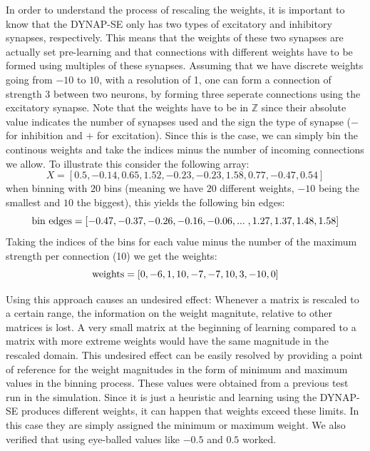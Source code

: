\documentclass[twoside,11pt]{article}
\begin{document}
In order to understand the process of rescaling the weights, it is important to know that
the DYNAP-SE only has two types of excitatory and inhibitory synapses, respectively.
This means that the weights of these two synapses are actually set pre-learning
and that connections with different weights have to be formed using multiples of these
synapses.
Assuming that we have discrete weights going from $-10$ to $10$, with a resolution of 1, one
can form a connection of strength 3 between two neurons, by forming three seperate connections
using the excitatory synapse. Note that the weights have to be in $\mathbb{Z}$ since
their absolute value indicates the number of synapses used and the sign the type of
synapse ($-$ for inhibition and $+$ for excitation).
Since this is the case, we can simply bin the continous weights and take the indices minus
the number of incoming connections we allow.
To illustrate this consider the following array:
\begin{equation*}
X = [ 0.5 , -0.14,  0.65,  1.52, -0.23, -0.23,  1.58,  0.77, -0.47, 0.54]
\end{equation*}
when binning with $20$ bins (meaning we have $20$ different weights, $-10$ being the smallest and $10$ the biggest),
this yields the following bin edges:
\begin{equation*}
\textnormal{bin edges} = [-0.47, -0.37, -0.26, -0.16, -0.06,  ... \; ,  1.27, 1.37,  1.48,  1.58]
\end{equation*}
Taking the indices of the bins for each value minus the number of the maximum strength per connection (10)
we get the weights:
\begin{equation*}
\textnormal{weights} = [  0,  -6,   1,  10,  -7,  -7,  10,   3, -10,   0]
\end{equation*}

Using this approach causes an undesired effect: Whenever a matrix is rescaled to a certain range,
the information on the weight magnitute, relative to other matrices is lost. A very small matrix at the
beginning of learning compared to a matrix with more extreme weights would have the same magnitude in
the rescaled domain. This undesired effect can be easily resolved by providing a point of reference for the
weight magnitudes in the form of minimum and maximum values in the binning process. These values were obtained
from a previous test run in the simulation. Since it is just a heuristic and learning using the DYNAP-SE produces
different weights, it can happen that weights exceed these limits. In this case they are simply assigned the
minimum or maximum weight. We also verified that using eye-balled values like $-0.5$ and $0.5$ worked. \\
\end{document}
